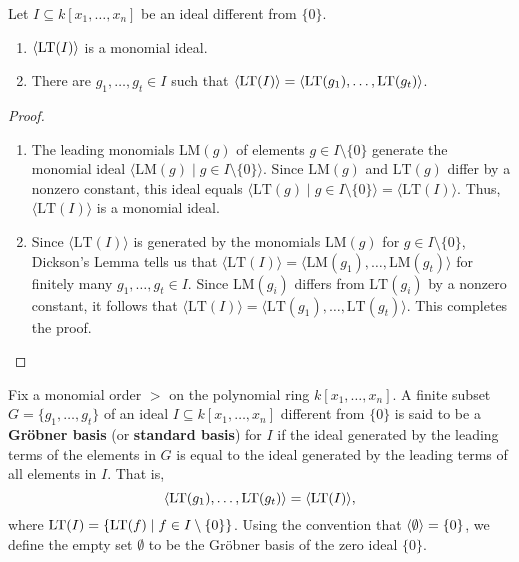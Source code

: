\begin{theorem} %
    \label{thm:initialIdeal_is_FG}
    \leanok 
    Let $I \subseteq k[x_1, \ldots , x_n]$ be an ideal different from $\{ 0 \}$.
    \begin{enumerate}
        \item $\langle\operatorname{LT}(I)\rangle$ is a monomial ideal.
        \item There are $g_1, \ldots , g_t \in I$ such that $\langle \operatorname{LT}(I)\rangle = \langle \operatorname{LT}(g_1), \ldots , \operatorname{LT}(g_t)\rangle$.
    \end{enumerate}
\end{theorem}
\begin{proof}
\leanok
\begin{enumerate}
    \item The leading monomials $\text{LM}(g)$ of elements $g \in I \setminus \{0\}$ generate the monomial ideal $\langle \text{LM}(g) \mid g \in I \setminus \{0\} \rangle$. 
      Since $\text{LM}(g)$ and $\text{LT}(g)$ differ by a nonzero constant, this ideal equals $\langle \text{LT}(g) \mid g \in I \setminus \{0\} \rangle = \langle \text{LT}(I) \rangle$. 
      Thus, $\langle \text{LT}(I) \rangle$ is a monomial ideal.
    \item Since $\langle \text{LT}(I) \rangle$ is generated by the monomials $\text{LM}(g)$ for $g \in I \setminus \{0\}$, Dickson's Lemma tells us that $\langle \text{LT}(I) \rangle = \langle \text{LM}(g_1), \dots, \text{LM}(g_t) \rangle$ for finitely many $g_1, \dots, g_t \in I$. 
      Since $\text{LM}(g_i)$ differs from $\text{LT}(g_i)$ by a nonzero constant, it follows that $\langle \text{LT}(I) \rangle = \langle \text{LT}(g_1), \dots, \text{LT}(g_t) \rangle$. 
      This completes the proof.
\end{enumerate}
\end{proof}

\begin{definition}\label{def:Groebner_basis}
    \leanok 
    Fix a monomial order $>$ on the polynomial ring $k[x_1, \dots, x_n]$. 
    A finite subset $G = \{g_1, \dots, g_t\}$ of an ideal $I \subseteq k[x_1, \dots, x_n]$ different from $\{0\}$ 
    is said to be a \textbf{Gr{\"o}bner basis} (or \textbf{standard basis}) for $I$ if the ideal generated by the
    leading terms of the elements in $G$ is equal to the ideal generated by the leading terms of all elements in $I$.
    That is,
    \[ \langle \operatorname{LT}(g_1), \dots, \operatorname{LT}(g_t) \rangle = \langle \operatorname{LT}(I) \rangle, \]
    where $\operatorname{LT}(I) = \{\operatorname{LT}(f) \mid f \in I \setminus \{0\}\}$.
    Using the convention that $\langle \emptyset \rangle = \{0\}$, we define the empty set $\emptyset$
    to be the Gr{\"o}bner basis of the zero ideal $\{0\}$.
\end{definition}

